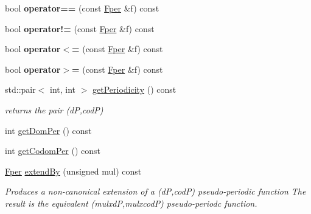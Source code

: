 \begin{DoxyCompactItemize}
\mbox{\label{classetvo_i_i_1_1_fper_acff60a459059cba547cfe17805ec4471}} 
bool {\bfseries operator==} (const \mbox{\hyperlink{classetvo_i_i_1_1_fper}{Fper}} \&f) const
\item 
\mbox{\label{classetvo_i_i_1_1_fper_a3e876b77b18c97fd86d13d709f70df59}} 
bool {\bfseries operator!=} (const \mbox{\hyperlink{classetvo_i_i_1_1_fper}{Fper}} \&f) const
\item 
\mbox{\label{classetvo_i_i_1_1_fper_a0e2e5814e3cb95b8a3182a19d08874ae}} 
bool {\bfseries operator$<$=} (const \mbox{\hyperlink{classetvo_i_i_1_1_fper}{Fper}} \&f) const
\item 
\mbox{\label{classetvo_i_i_1_1_fper_aa9520fb6e4f535c8a3b752652aaa2273}} 
bool {\bfseries operator$>$=} (const \mbox{\hyperlink{classetvo_i_i_1_1_fper}{Fper}} \&f) const
\item 
\mbox{\label{classetvo_i_i_1_1_fper_a67646af73cb4e469779888e4b86e5140}} 
std\+::pair$<$ int, int $>$ \mbox{\hyperlink{classetvo_i_i_1_1_fper_a67646af73cb4e469779888e4b86e5140}{get\+Periodicity}} () const
\begin{DoxyCompactList}\small\item\em returns the pair (dP,codP) \end{DoxyCompactList}\item 
int \mbox{\hyperlink{classetvo_i_i_1_1_fper_af82745f0d1e1a2ba21dc12e2015e8106}{get\+Dom\+Per}} () const
\item 
int \mbox{\hyperlink{classetvo_i_i_1_1_fper_a6236d82b48257367de8b2284e099388e}{get\+Codom\+Per}} () const
\item 
\mbox{\label{classetvo_i_i_1_1_fper_a3622128e1869405e7a856076b95f18d7}} 
\mbox{\hyperlink{classetvo_i_i_1_1_fper}{Fper}} \mbox{\hyperlink{classetvo_i_i_1_1_fper_a3622128e1869405e7a856076b95f18d7}{extend\+By}} (unsigned mul) const
\begin{DoxyCompactList}\small\item\em Produces a non-\/canonical extension of a (dP,codP) pseudo-\/periodic function The result is the equivalent (mulxdP,mulxcodP) pseudo-\/periodc function. \end{DoxyCompactList}\item 

\end{DoxyCompactItemize}
